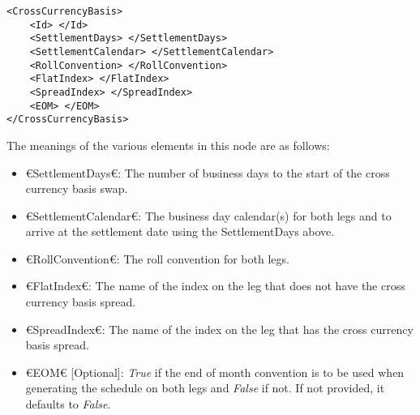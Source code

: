 {\footnotesize
\begin{lstlisting}[caption={Cross currency basis swap conventions}, label=lst:xccy_basis_conventions]
<CrossCurrencyBasis>
	<Id> </Id>
	<SettlementDays> </SettlementDays>
	<SettlementCalendar> </SettlementCalendar>
	<RollConvention> </RollConvention>
	<FlatIndex> </FlatIndex>
	<SpreadIndex> </SpreadIndex>
	<EOM> </EOM>
</CrossCurrencyBasis>
\end{lstlisting}
}

The meanings of the various elements in this node are as follows:
\begin{itemize}
\item €SettlementDays€: The number of business days to the start of the cross currency basis swap.
\item €SettlementCalendar€: The business day calendar(s) for both legs and to arrive at the settlement date using the 
SettlementDays above.
\item €RollConvention€: The roll convention for both legs.
\item €FlatIndex€: The name of the index on the leg that does not have the cross currency basis spread.
\item €SpreadIndex€: The name of the index on the leg that has the cross currency basis spread.
\item €EOM€ [Optional]: \emph{True} if the end of month convention is to be used when generating the schedule on both legs 
and \emph{False} if not. If not provided, it defaults to \emph{False}.
\end{itemize}
